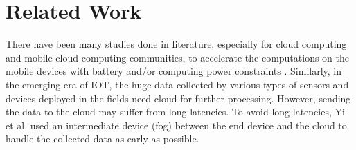 \documentclass[conference]{IEEEtran}
\def\sectionname{Section}
\begin{document}
%
%

\section{Related Work}
\label{sec:relatedwork}
There have been many studies done in literature, especially for cloud computing and mobile cloud computing communities, to accelerate the computations on the mobile devices with battery and/or computing power constraints \cite{xiao2012vocl,Tu14,fernando2013mobile,Hung14,HungTWS15,yi2015fog,Tseng15,Silla14}.
Similarly, in the emerging era of IOT, the huge data collected by various types of sensors and devices deployed in the fields need cloud for further processing. However, sending the data to the cloud may suffer from long latencies. To avoid long latencies, Yi et al. \cite{yi2015fog} used an intermediate device (fog) between the end device and the cloud to handle the collected data as early as possible.
\end{document}
